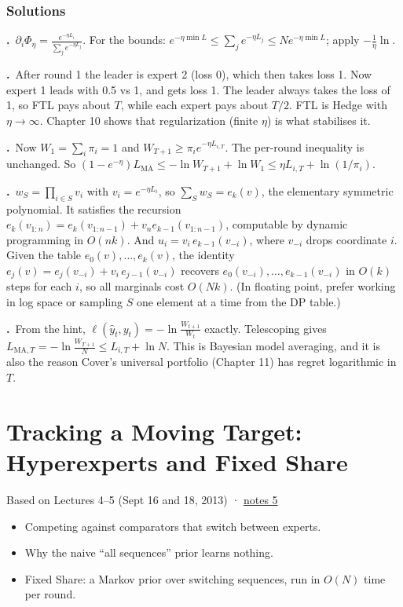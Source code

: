 \documentclass[11pt,a4paper,openany]{book}
\newcommand{\hy}{\hat{y}}
\newcommand{\chapsource}[1]{{\small\sffamily\color{muted}#1\par}\medskip}
\newenvironment{solutions}{\small}{}
\newcommand{\sol}[2]{\par\smallskip\noindent\textbf{\sffamily #1.}\ #2\par}
\begin{document}
\subsection*{Solutions}
\begin{solutions}
\sol{3.1}{$\partial_i\Phi_\eta=\frac{e^{-\eta L_i}}{\sum_je^{-\eta L_j}}$. For the bounds: $e^{-\eta\min L}\le\sum_je^{-\eta L_j}\le Ne^{-\eta\min L}$; apply $-\frac1\eta\ln$.}
\sol{3.2}{After round 1 the leader is expert 2 (loss 0), which then takes loss 1. Now expert 1 leads with 0.5 vs 1, and gets loss 1. The leader always takes the loss of 1, so FTL pays about $T$, while each expert pays about $T/2$. FTL is Hedge with $\eta\to\infty$. Chapter 10 shows that regularization (finite $\eta$) is what stabilises it.}
\sol{3.3}{Now $W_1=\sum_i\pi_i=1$ and $W_{T+1}\ge\pi_ie^{-\eta L_{i,T}}$. The per-round inequality is unchanged. So $(1-e^{-\eta})L_{\mathrm{MA}}\le-\ln W_{T+1}+\ln W_1\le\eta L_{i,T}+\ln(1/\pi_i)$.}
\sol{3.4}{$w_S=\prod_{i\in S}v_i$ with $v_i=e^{-\eta L_i}$, so $\sum_Sw_S=e_k(v)$, the elementary symmetric polynomial. It satisfies the recursion $e_k(v_{1:n})=e_k(v_{1:n-1})+v_ne_{k-1}(v_{1:n-1})$, computable by dynamic programming in $O(nk)$. And $u_i=v_i\,e_{k-1}(v_{-i})$, where $v_{-i}$ drops coordinate $i$. Given the table $e_0(v),\dots,e_k(v)$, the identity $e_j(v)=e_j(v_{-i})+v_i\,e_{j-1}(v_{-i})$ recovers $e_0(v_{-i}),\dots,e_{k-1}(v_{-i})$ in $O(k)$ steps for each $i$, so all marginals cost $O(Nk)$. (In floating point, prefer working in log space or sampling $S$ one element at a time from the DP table.)}
\sol{3.5}{From the hint, $\ell(\hy_t,y_t)=-\ln\frac{W_{t+1}}{W_t}$ exactly. Telescoping gives $L_{\mathrm{MA},T}=-\ln\frac{W_{T+1}}{N}\le L_{i,T}+\ln N$. This is Bayesian model averaging, and it is also the reason Cover's universal portfolio (Chapter 11) has regret logarithmic in $T$.}
\end{solutions}

\chapter[Tracking a moving target]{Tracking a Moving Target: Hyperexperts and Fixed Share}\label{ch4}
\chapsource{Based on Lectures 4–5 (Sept 16 and 18, 2013) · \href{https://web.eecs.umich.edu/~jabernet/eecs598course/fall2013/web/notes/lec5_091813.pdf}{notes 5}}

\begin{goals}
\begin{itemize}
\item Competing against comparators that switch between experts.
\item Why the naive ``all sequences'' prior learns nothing.
\item Fixed Share: a Markov prior over switching sequences, run in $O(N)$ time per round.
\end{itemize}
\end{goals}
\end{document}
